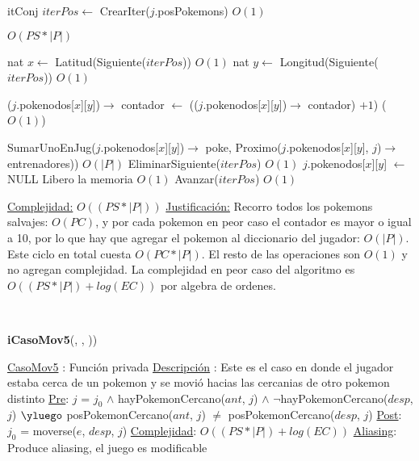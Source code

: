 \begin{Algoritmos}
\begin{algorithmic}[1]
$ $\newline


\State itConj $iterPos \gets$ CrearIter($j$.posPokemons) \Comment $O(1)$ 

 \Comment $O(PS * |P|)$

  \State nat $x \gets$ Latitud(Siguiente($iterPos$)) \Comment $O(1)$
  \State nat $y \gets$ Longitud(Siguiente($iterPos$)) \Comment $O(1)$   
  
  \State ($j$.pokenodos[$x$][$y$])$\rightarrow$ contador $\gets$ (($j$.pokenodos[$x$][$y$])$\rightarrow$ contador) $+ 1$) \Comment($O(1)$)
  
    \State SumarUnoEnJug($j$.pokenodos[$x$][$y$])$\rightarrow$ poke, Proximo($j$.pokenodos[$x$][$y$], $j$)$\rightarrow$ entrenadores)) \Comment $O(|P|)$
    \State EliminarSiguiente($iterPos$) \Comment $O(1)$
    \State $j$.pokenodos[$x$][$y$] $\gets$ NULL \Comment Libero la memoria $O(1)$
  \Else 
    \State Avanzar($iterPos$) \Comment $O(1)$ 
  \EndIf

\EndWhile 



\medskip
\Statex \underline{Complejidad:} $O((PS *|P|))$ 
\Statex \underline{Justificaci\'on:} Recorro todos los pokemons salvajes: $O(PC)$, y por cada pokemon en peor caso el contador es mayor o igual a 10, por lo que hay que agregar el pokemon al diccionario del jugador: $O(|P|)$. Este ciclo en total cuesta $O(PC*|P|)$. El resto de las operaciones son $O(1)$ y no agregan complejidad. La complejidad en peor caso del algoritmo es $O((PS *|P|) + log(EC))$ por algebra de ordenes.
\end{algorithmic}

$ $\newline
$ $\newline


{\textbf{iCasoMov5}(,  , ))}
\begin{algorithmic}[1]

\Statex \underline{CasoMov5} : Funci\'on privada 
\Statex \underline{Descripci\'on} : Este es el caso en donde el jugador estaba cerca de un pokemon y se movi\'o hacias las cercanias de otro pokemon distinto
\Statex \underline{Pre}: $j$ = $j_0$ $\land$ hayPokemonCercano($ant$, $j$) $\land$ $\neg$hayPokemonCercano($desp$, $j$) $\yluego$ posPokemonCercano($ant$, $j$) $\neq$ posPokemonCercano($desp$, $j$)
\Statex \underline{Post}: $j_0$ = moverse($e$, $desp$, $j$) 
\Statex \underline{Complejidad}:  $O((PS *|P|) + log(EC))$ 
\Statex \underline{Aliasing}: Produce aliasing, el juego es modificable


\end{algorithmic}
\end{Algoritmos}
